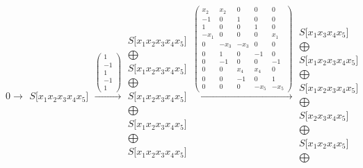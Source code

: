 \documentclass[12pt,a3paper,landscape]{amsart}
\numberwithin{equation}{section}
\theoremstyle{plain}
\theoremstyle{definition}
\begin{document}
$$
0 \rightarrow \begin{matrix}
S \lbrack x_{1}x_{2}x_{3}x_{4}x_{5} \rbrack
\end{matrix}
\xrightarrow{\left( \begin{matrix}
1 \\
-1 \\
1 \\
-1 \\
1
\end{matrix} \right)}\begin{matrix}
S \lbrack x_{1}x_{2}x_{3}x_{4}x_{5} \rbrack \\ \bigoplus \\
S \lbrack x_{1}x_{2}x_{3}x_{4}x_{5} \rbrack \\ \bigoplus \\
S \lbrack x_{1}x_{2}x_{3}x_{4}x_{5} \rbrack \\ \bigoplus \\
S \lbrack x_{1}x_{2}x_{3}x_{4}x_{5} \rbrack \\ \bigoplus \\
S \lbrack x_{1}x_{2}x_{3}x_{4}x_{5} \rbrack
\end{matrix}
\xrightarrow{\left( \begin{matrix}
x_{2} & x_{2} & 0 & 0 & 0 \\
-1 & 0 & 1 & 0 & 0 \\
1 & 0 & 0 & 1 & 0 \\
-x_{1} & 0 & 0 & 0 & x_{1} \\
0 & -x_{3} & -x_{3} & 0 & 0 \\
0 & 1 & 0 & -1 & 0 \\
0 & -1 & 0 & 0 & -1 \\
0 & 0 & x_{4} & x_{4} & 0 \\
0 & 0 & -1 & 0 & 1 \\
0 & 0 & 0 & -x_{5} & -x_{5}
\end{matrix} \right)}\begin{matrix}
S \lbrack x_{1}x_{3}x_{4}x_{5} \rbrack \\ \bigoplus \\
S \lbrack x_{1}x_{2}x_{3}x_{4}x_{5} \rbrack \\ \bigoplus \\
S \lbrack x_{1}x_{2}x_{3}x_{4}x_{5} \rbrack \\ \bigoplus \\
S \lbrack x_{2}x_{3}x_{4}x_{5} \rbrack \\ \bigoplus \\
S \lbrack x_{1}x_{2}x_{4}x_{5} \rbrack \\ \bigoplus \\

\end{matrix}$$
\end{document}
